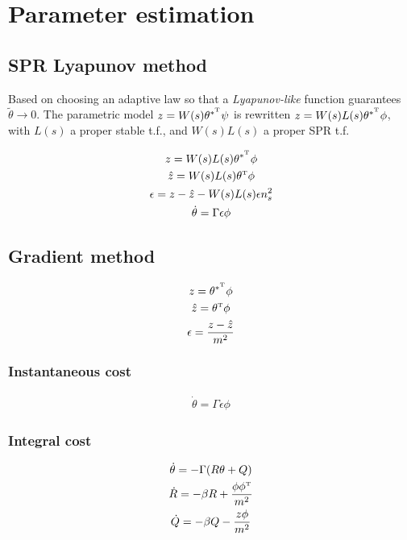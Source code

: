 \section{Parameter estimation}

\subsection{SPR Lyapunov method}
Based on choosing an adaptive law so that a \emph{Lyapunov-like} function guarantees $\tilde{\theta} \rightarrow 0$. The parametric model $z = W(s) \theta^{*^{\scriptscriptstyle \mathrm{T}}} \psi$ is rewritten $z = W(s) L(s) \theta^{*^{\scriptscriptstyle \mathrm{T}}} \phi$, with $L(s)$ a proper stable t.f., and $W(s)L(s)$ a proper SPR t.f.

\begin{gather}
	z = W(s) L(s) \theta^{*^{\scriptscriptstyle \mathrm{T}}} \phi \\
	\hat{z} = W(s)L(s) \theta^{\scriptscriptstyle \mathrm{T}} \phi \\
	\epsilon = z - \hat{z} - W(s) L(s) \epsilon n_s^2 \\
	\dot{\theta} = \Gamma \epsilon \phi
\end{gather}

\subsection{Gradient method}
\begin{gather}
	z = \theta^{*^{\scriptscriptstyle \mathrm{T}}} \phi \\
	\hat{z} = \theta^{\scriptscriptstyle \mathrm{T}} \phi \\
	\epsilon = \frac{z - \hat{z}}{m^2}
\end{gather}

\subsubsection{Instantaneous cost}
\begin{gather}
	\dot{\theta} = \Gamma \epsilon \phi
\end{gather}

\subsubsection{Integral cost}
\begin{gather}
	\dot{\theta} = - \Gamma (R \theta + Q) \\
	\dot{R} = - \beta R + \frac{\phi \phi^{\scriptscriptstyle \mathrm{T}}}{m^2} \\
	\dot{Q} = - \beta Q - \frac{z \phi}{m^2}
\end{gather}

